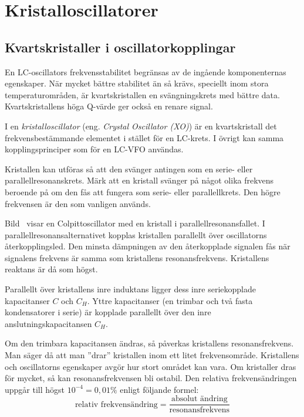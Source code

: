 \section{Kristalloscillatorer}
\label{kristalloscillator}

\subsection{Kvartskristaller i oscillator\-kopplingar}

En LC-oscillators frekvensstabilitet begränsas av de ingående
komponenternas egenskaper.
När mycket bättre stabilitet än så krävs, speciellt inom stora
temperaturområden, är kvartskristallen en svängningskrets med bättre data.
Kvartskristallens höga Q-värde ger också en renare signal.


I en \emph{kristalloscillator} (eng. \emph{Crystal Oscillator (XO)}) är en
kvartskristall det frekvensbestämmande elementet i stället för en LC-krets.
I övrigt kan samma kopplingsprinciper som för en LC-VFO användas.

Kristallen kan utföras så att den svänger antingen som en serie- eller
parallellresonanskrets.
Märk att en kristall svänger på något olika frekvens beroende på om den fås
att fungera som serie- eller parallellkrets.
Den högre frekvensen är den som vanligen används.

Bild~ visar en Colpittoscillator med en kristall i
parallellresonansfallet.
I parallellresonansalternativet kopplas kristallen parallellt över
oscillatorns återkopplingsled.
Den minsta dämpningen av den återkopplade signalen fås när signalens frekvens
är samma som kristallens resonansfrekvens.
Kristallens reaktans är då som högst.

Parallellt över kristallens inre induktans ligger dess inre
seriekopplade kapacitanser \(C\) och \(C_H\).
Yttre kapacitanser (en trimbar och två fasta kondensatorer i serie) är kopplade
parallellt över den inre anslutningskapacitansen \(C_H\).

Om den trimbara kapacitansen ändras, så påverkas kristallens resonansfrekvens.
Man säger då att man ''drar'' kristallen inom ett litet frekvensområde.
Kristallens och oscillatorns egenskaper avgör hur stort området kan vara.
Om kristaller dras för mycket, så kan resonansfrekvensen bli ostabil.
Den relativa frekvensändringen uppgår till högst \(10^{-4} = 0,01\%\)
enligt följande formel:
%
\[
\text{relativ frekvensändring} =
\frac{\text{absolut ändring}}{\text{resonansfrekvens}}
\]

